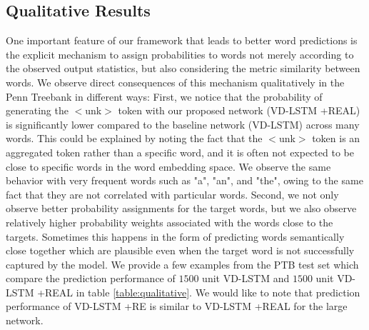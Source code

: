 \subsection{Qualitative Results}
One important feature of our framework that leads to better word predictions is the explicit mechanism to assign probabilities to words not merely according to the observed output statistics, but also considering the metric similarity between words.
We observe direct consequences of this mechanism qualitatively in the Penn Treebank in different ways: First, we notice that the probability of generating the $<$unk$>$ token with our proposed network (VD-LSTM +REAL) is significantly lower compared to the baseline network (VD-LSTM) across many words.
This could be explained by noting the fact that the $<$unk$>$ token is an aggregated token rather than a specific word, and it is often not expected to be close to specific words in the word embedding space.
We observe the same behavior with very frequent words such as "a", "an", and "the", owing to the same fact that they are not correlated with particular words.
Second, we not only observe better probability assignments for the target words, but we also observe relatively higher probability weights associated with the words close to the targets.
Sometimes this happens in the form of predicting words semantically close together which are plausible even when the target word is not successfully captured by the model.
We provide a few examples from the PTB test set which compare the prediction performance of $1500$ unit VD-LSTM and $1500$ unit VD-LSTM +REAL in table \ref{table:qualitative}.
We would like to note that prediction performance of VD-LSTM +RE is similar to VD-LSTM +REAL for the large network.

